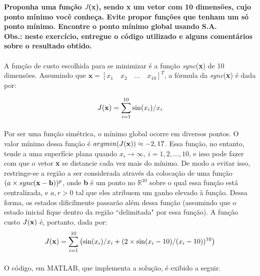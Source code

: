 \documentclass{report}
\begin{document}
\textbf{Proponha uma função $J$(x), sendo x um vetor com 10 dimensões, cujo ponto mínimo você conheça. Evite propor funções que tenham um só ponto mínimo. Encontre o ponto mínimo global usando S.A.}\\

\textbf{Obs.: neste exercício, entregue o código utilizado e alguns comentários sobre o resultado obtido.}\\

\paragraph{} A função de custo escolhida para se minimizar é a função \emph{sync}(\textbf{x}) de 10 dimensões. Assumindo que $\mathbf{x} = [x_1 \quad x_2 \quad ... \quad x_{10}]^T$, a fórmula da \emph{sync}(\textbf{x}) é dada por:

\begin{equation*}
J(\text{\textbf{x}}) = \sum_{i=1}^{10} \sin(x_i)/x_i
\end{equation*}

\paragraph{} Por ser uma função simétrica, o mínimo global ocorre em diversos pontos. O valor mínimo dessa função é $argmin(J(\text{\textbf{x}})) \approx -2,17$. Essa função, no entanto, tende a uma superfície plana quando $x_i \rightarrow \infty, \ i = 1,2,...,10$, e isso pode fazer com que o vetor \textbf{x} se distancie cada vez mais do mínimo. De modo a evitar isso, restringe-se a região a ser considerada através da colocação de uma função $(a \times sync(\text{\textbf{x}} - \text{\textbf{b}}))^{p}$, onde \textbf{b} é um ponto no $\mathbb{R}^{10}$ sobre o qual essa função está centralizada, e $a, r > 0$ tal que eles atribuem um ganho elevado à função. Dessa forma, os estados dificilmente passarão além dessa função (assumindo que o estado inicial fique dentro da região ``delimitada" por essa função). A função custo $J(\text{\textbf{x}})$ é, portanto, dada por:\\

\begin{equation*}
J(\text{\textbf{x}}) = \sum_{i=1}^{10} \left(\sin(x_i)/x_i + (2 \times \sin(x_i - 10)/(x_i - 10))^{10}\right)
\end{equation*}

\paragraph{} O código, em MATLAB, que implementa a solução, é exibido a seguir.\\
\end{document}
